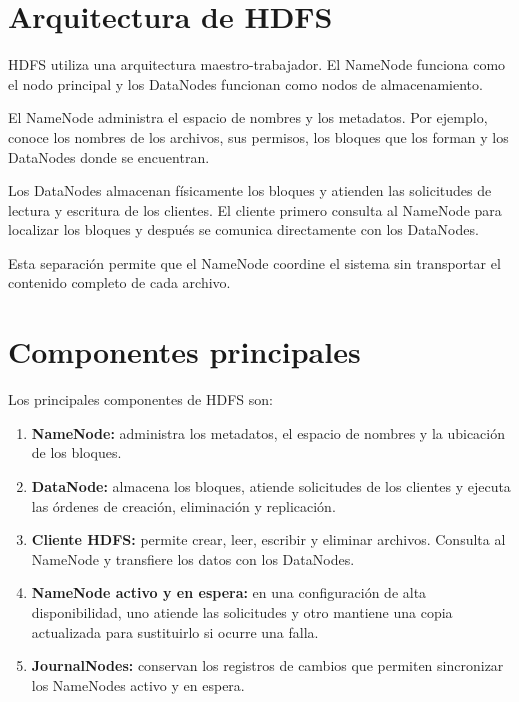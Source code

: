 \section{Arquitectura de HDFS}

HDFS utiliza una arquitectura maestro-trabajador. El NameNode funciona como
el nodo principal y los DataNodes funcionan como nodos de almacenamiento.

El NameNode administra el espacio de nombres y los metadatos. Por ejemplo,
conoce los nombres de los archivos, sus permisos, los bloques que los forman
y los DataNodes donde se encuentran.

Los DataNodes almacenan físicamente los bloques y atienden las solicitudes de
lectura y escritura de los clientes. El cliente primero consulta al NameNode
para localizar los bloques y después se comunica directamente con los
DataNodes.

Esta separación permite que el NameNode coordine el sistema sin transportar
el contenido completo de cada archivo.

\section{Componentes principales}

Los principales componentes de HDFS son:

\begin{enumerate}
    \item \textbf{NameNode:} administra los metadatos, el espacio de nombres
    y la ubicación de los bloques.

    \item \textbf{DataNode:} almacena los bloques, atiende solicitudes de los
    clientes y ejecuta las órdenes de creación, eliminación y replicación.

    \item \textbf{Cliente HDFS:} permite crear, leer, escribir y eliminar
    archivos. Consulta al NameNode y transfiere los datos con los DataNodes.

    \item \textbf{NameNode activo y en espera:} en una configuración de alta
    disponibilidad, uno atiende las solicitudes y otro mantiene una copia
    actualizada para sustituirlo si ocurre una falla.

    \item \textbf{JournalNodes:} conservan los registros de cambios que
    permiten sincronizar los NameNodes activo y en espera.
\end{enumerate}


